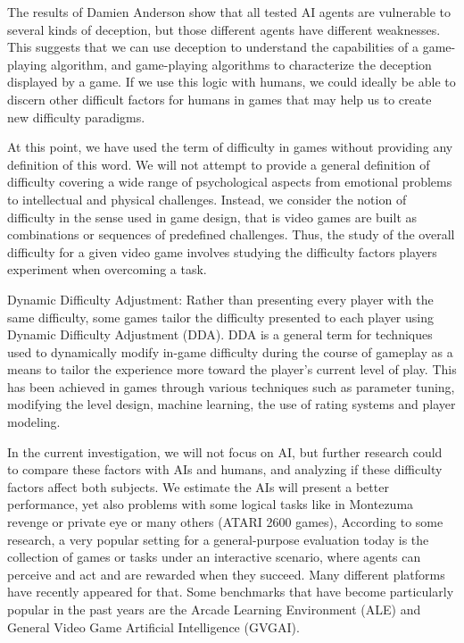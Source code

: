 The results of Damien Anderson show that all tested AI agents are vulnerable to several kinds of deception, but those different agents have different weaknesses. This suggests that we can use deception to understand the capabilities of a game-playing algorithm, and game-playing algorithms to characterize the deception displayed by a game. If we use this logic with humans, we could ideally be able to discern other difficult factors for humans in games that may help us to create new difficulty paradigms. \cite{Anderson2018Deceptive}

At this point, we have used the term of difficulty in games without providing any definition of this word. We will not attempt to provide a general definition of difficulty covering a wide range of psychological aspects from emotional problems to intellectual and physical challenges. Instead, we consider the notion of difficulty in the sense used in game design, that is video games are built as combinations or sequences of predefined challenges. Thus, the study of the overall difficulty for a given video game involves studying the difficulty factors players experiment when overcoming a task.  \cite{Aponte2011DifVideoGames}

Dynamic Difficulty Adjustment: Rather than presenting every player with the same difficulty, some games tailor the difficulty presented to each player using Dynamic Difficulty Adjustment (DDA). DDA is a general term for techniques used to dynamically modify in-game difficulty during the course of gameplay as a means to tailor the experience more toward the player’s current level of play. This has been achieved in games through various techniques such as parameter tuning, modifying the level design, machine learning, the use of rating systems and player modeling. \cite{Sarkar2019TransDif}

In the current investigation, we will not focus on AI, but further research could to compare these factors with AIs and humans, and analyzing if these difficulty factors affect both subjects. We estimate the AIs will present a better performance, yet also problems with some logical tasks like in Montezuma revenge or private eye or many others (ATARI 2600 games), According to some research, a very popular setting for a general-purpose evaluation today is the collection of games or tasks under an interactive scenario, where agents can perceive and act and are rewarded when they succeed. Many different platforms have recently appeared for that. Some benchmarks that have become particularly popular in the past years are the Arcade Learning Environment (ALE) and General Video Game Artificial Intelligence (GVGAI). \cite{Bontrager2019Superstition, Anderson2018Deceptive, Plumed2018DualIn}


\newpage